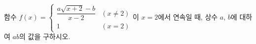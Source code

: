 함수 $f(x)=\begin{cases} \dfrac{a\sqrt{x+2}-b}{x-2} & (x\ne 2) \\ 1 & (x=2) \end{cases}$이 $x=2$에서 연속일 때, 상수 $a$, $b$에 대하여 $ab$의 값을 구하시오.
